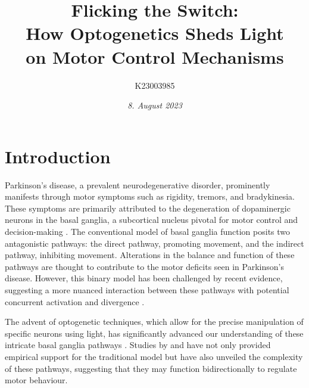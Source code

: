 \documentclass[10pt]{article}
\title{\textbf{Flicking the Switch: } \\ How Optogenetics Sheds Light \\ on Motor Control Mechanisms}
\author[ ]{K23003985}
\affil[ ]{\textbf{King’s College London}}
\affil[ ]{\href{mailto:K23003985@kcl.ac.uk}{K23003985@kcl.ac.uk}}
\date{\textit{8. August 2023}}
\begin{document}

\maketitle

\begin{sloppypar} %





  \doublespacing


  \section{Introduction}
  \label{sec:introduction}

  Parkinson’s disease, a prevalent neurodegenerative disorder, prominently manifests through motor symptoms such as rigidity, tremors, and bradykinesia. These symptoms are primarily attributed to the degeneration of dopaminergic neurons in the basal ganglia, a subcortical nucleus pivotal for motor control and decision-making \citep{kravitz_regulation_2010}. The conventional model of basal ganglia function posits two antagonistic pathways: the direct pathway, promoting movement, and the indirect pathway, inhibiting movement. Alterations in the balance and function of these pathways are thought to contribute to the motor deficits seen in Parkinson’s disease. However, this binary model has been challenged by recent evidence, suggesting a more nuanced interaction between these pathways with potential concurrent activation and divergence \citep{dunovan_believer-skeptic_2016}.

  The advent of optogenetic techniques, which allow for the precise manipulation of specific neurons using light, has significantly advanced our understanding of these intricate basal ganglia pathways \citep{kravitz_regulation_2010, cui_concurrent_2013}. Studies by \cite{kravitz_regulation_2010} and \cite{cui_concurrent_2013} have not only provided empirical support for the traditional model but have also unveiled the complexity of these pathways, suggesting that they may function bidirectionally \citep{yttri_opponent_2016} to regulate motor behaviour.


\end{sloppypar}
\end{document}
